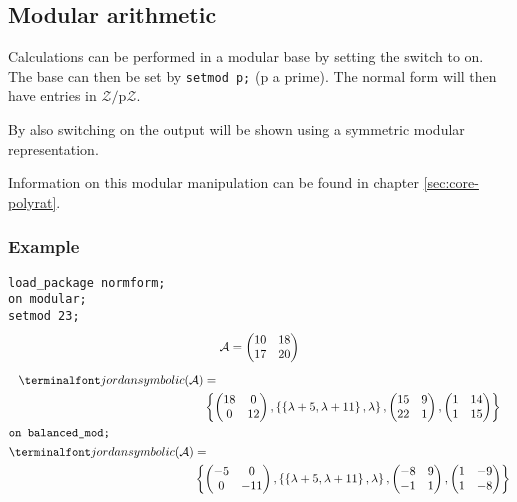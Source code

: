 

\subsection{Modular arithmetic}
\label{sec:normform-modular}

Calculations can be performed in a modular base by setting the switch 
to on. The base can then be set by \texttt{setmod p;} (p a prime). The 
normal form will then have entries in $\mathcal{Z}/$p$\mathcal{Z}$. 

By also switching on  the output will be shown using
a symmetric modular representation. 

Information on this modular manipulation can be found in chapter \ref{sec:core-polyrat}.

\subsubsection{Example}

\texttt{load\_package normform;} \\
\texttt{on modular;} \\
\texttt{setmod 23;} 
\begin{gather*}
\mathcal{A} = \begin{pmatrix} 10 & 18 \\ 17 & 20 \end{pmatrix} \\[2mm]
\begin{split}
\f{jordansymbolic}(\mathcal{A}) &= \\ 
&\left\{
 \begin{pmatrix} 18 & 0 \\ 0 & 12 \end{pmatrix},
 \left\{ \left\{ \lambda + 5, \lambda + 11  \right\}, \lambda \right\}, 
         \begin{pmatrix} 15 & 9 \\ 22 & 1 \end{pmatrix},
         \begin{pmatrix} 1 & 14 \\ 1 & 15 \end{pmatrix} \right\}
\end{split} \\
\intertext{\texttt{on balanced\_mod;}}
\begin{split}
\f{jordansymbolic}(\mathcal{A}) & = \\
&\left\{
  \begin{pmatrix} -5 & 0 \\ 0 & -11 \end{pmatrix},
  \left\{ \left\{ \lambda + 5, \lambda + 11  \right\}, \lambda \right\}, 
  \begin{pmatrix} -8 & 9 \\ -1 & 1 \end{pmatrix},
  \begin{pmatrix} 1 & -9 \\ 1 & -8 \end{pmatrix} \right\}
\end{split}
\end{gather*}


